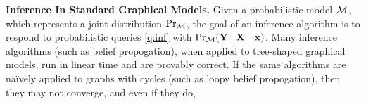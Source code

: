 \documentclass[twoside]{article}
\begin{document}
\textbf{Inference In Standard Graphical Models.}
Given a probabilistic model $\cal M$, which represents a joint distribution $\Pr_{\cal M}$, the goal of an inference algorithm 
is to respond to probabilistic queries
\eqref{q:inf} with $\Pr_{\cal M}(\mathbf{Y} \mid \mathbf{X} \!=\! \mathbf{x})$. 
Many inference algorithms (such as belief propogation), 
when applied to tree-shaped graphical models,
run in linear time and are
provably correct.  
If the same algorithms are na{\"i}vely applied to graphs with cycles (such as loopy belief propogation), 
then they may not converge, and even if they do, 
\end{document}
